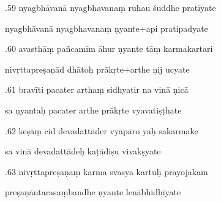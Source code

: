 \documentclass[article,12pt,a4paper]{memoir}%
\newcounter{parCount}
\begin{document}
	  
	  \pstart {}.59 nyagbhāvanā nyagbhavanaṃ ruhau śuddhe pratīyate 
	{}
	\pend%
      

	  
	  \pstart \leavevmode%
	nyagbhāvanā nyagbhavanaṃ ṇyante+api pratipadyate 
	{}
	\pend%
      

	  
	  \pstart {}.60 avasthāṃ pañcamīm āhur ṇyante tāṃ karmakartari 
	{}
	\pend%
      

	  
	  \pstart \leavevmode%
	nivṛttapreṣaṇād dhātoḥ prākṛte+arthe ṇij ucyate 
	{}
	\pend%
      

	  
	  \pstart {}.61 bravīti pacater arthaṃ sidhyatir na vinā ṇicā 
	{}
	\pend%
      

	  
	  \pstart \leavevmode%
	sa ṇyantaḥ pacater arthe prākṛte vyavatiṣṭhate 
	{}
	\pend%
      

	  
	  \pstart {}.62 keṣāṃ cid devadattāder vyāpāro yaḥ sakarmake 
	{}
	\pend%
      

	  
	  \pstart \leavevmode%
	sa vinā devadattādeḥ kaṭādiṣu vivakṣyate 
	{}
	\pend%
      

	  
	  \pstart {}.63 nivṛttapreṣaṇaṃ karma svasya kartuḥ prayojakam 
	{}
	\pend%
      

	  
	  \pstart \leavevmode%
	preṣaṇāntarasaṃbandhe ṇyante lenābhidhīyate 
	{}
	\pend%
      
\end{document}
